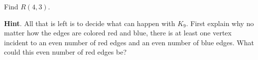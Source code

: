 \documentclass{book}
\begin{document}
\setcounter{cpjt}{51}
\addtocounter{cpjt}{-1}
\begin{activity}\label{activity-44}
\hypertarget{p-415}{}%
Find \(R(4,3)\).%
\par\smallskip%
\noindent\textbf{Hint}.\hypertarget{hint-21}{}\quad%
\hypertarget{p-416}{}%
All that is left is to decide what can happen with \(K_9\).  First explain why no matter how the edges are colored red and blue, there is at least one vertex incident to an even number of red edges and an even number of blue edges.  What could this even number of red edges be?%
\par\smallskip%
\noindent\end{activity}

\clearpage
\end{document}
